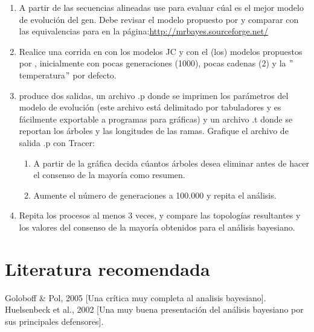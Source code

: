\begin{enumerate}

	\item A partir de las secuencias alineadas use  para evaluar c\'ual es el mejor modelo de evoluci\'on del gen. Debe revisar el modelo propuesto por  y comparar con las equivalencias para  en la p\'agina:\url{http://mrbayes.sourceforge.net/}

	\item 	Realice una corrida en  con los modelos JC y con el (los) modelos propuestos por , inicialmente con pocas generaciones (1000), pocas cadenas (2) y la $"$temperatura$"$ por defecto.

	\item {} produce dos salidas, un archivo .p donde se imprimen los par\'ametros del modelo de evoluci\'on (este archivo est\'a delimitado por tabuladores y es f\'acilmente exportable a programas para gr\'aficas) y un archivo .t donde se reportan los \'arboles y las longitudes de las ramas. Grafique el archivo de salida .p con Tracer:

	\begin{enumerate}
		\item A partir de la gr\'afica decida c\'uantos \'arboles desea eliminar antes de hacer el consenso de la mayor\'ia como resumen.


		\item Aumente el n\'umero de generaciones a 100.000 y repita el an\'alisis.
	\end{enumerate}	

	\item Repita los procesos al menos 3 veces, y compare las topolog\'ias resultantes y los valores del consenso de la mayor\'ia obtenidos para el an\'alisis bayesiano.

\end{enumerate}







\section*{Literatura recomendada}

Goloboff \& Pol, 2005 [Una cr\'itica muy completa al analisis bayesiano].\\
Huelsenbeck et al., 2002 [Una muy buena presentaci\'on del an\'alisis bayesiano por sus principales defensores].
